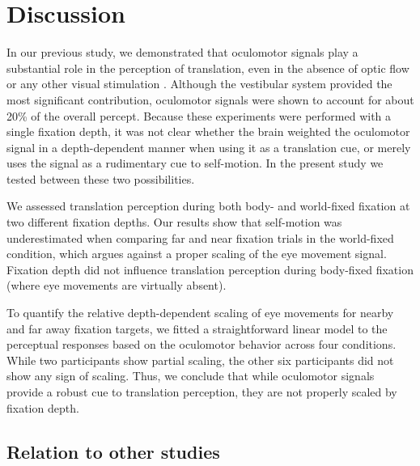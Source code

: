

\section{Discussion}

In our previous study, we demonstrated that oculomotor signals play a substantial role in the perception of translation, even in the absence of optic flow or any other visual stimulation \cite{clemens2015a}. Although the vestibular system provided the most significant contribution, oculomotor signals were shown to account for about 20\% of the overall percept. Because these experiments were performed with a single fixation depth, it was not clear whether the brain weighted the oculomotor signal in a depth-dependent manner when using it as a translation cue, or merely uses the signal as a rudimentary cue to self-motion. In the present study we tested between these two possibilities.

We assessed translation perception during both body- and world-fixed fixation at two different fixation depths. Our results show that self-motion was underestimated when comparing far and near fixation trials in the world-fixed condition, which argues against a proper scaling of the eye movement signal. Fixation depth did not influence translation perception during body-fixed fixation (where eye movements are virtually absent).

To quantify the relative depth-dependent scaling of eye movements for nearby and far away fixation targets, we fitted a straightforward linear model to the perceptual responses based on the oculomotor behavior across four conditions. While two participants show partial scaling, the other six participants did not show any sign of scaling. Thus, we conclude that while oculomotor signals provide a robust cue to translation perception, they are not properly scaled by fixation depth.


\subsection{Relation to other studies}

